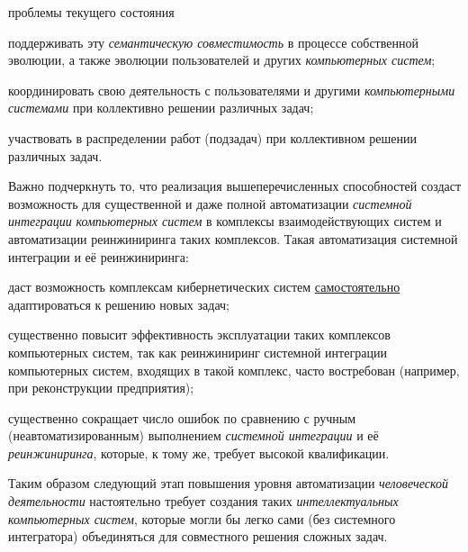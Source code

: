 \begin{scnsubstruct}
\begin{scnrelfromset}{проблемы текущего состояния}
{\begin{scnitemize}
                \item поддерживать эту \textit{семантическую совместимость} в процессе собственной эволюции, а также эволюции пользователей и других \textit{компьютерных систем};
                \item координировать свою деятельность с пользователями и другими \textit{компьютерными системами} при коллективно решении различных задач;
                \item участвовать в распределении работ (подзадач) при коллективном решении различных задач.
            \end{scnitemize}
            Важно подчеркнуть то, что реализация вышеперечисленных способностей создаст возможность для существенной и даже полной автоматизации \textit{системной интеграции} \textit{компьютерных систем} в комплексы взаимодействующих систем и автоматизации реинжиниринга таких комплексов. Такая автоматизация системной интеграции и её реинжиниринга:\\
            \begin{scnitemize}
                \item даст возможность комплексам кибернетических систем \uline{самостоятельно} адаптироваться к решению новых задач;
                \item существенно повысит эффективность эксплуатации таких комплексов компьютерных систем, так как реинжиниринг системной интеграции компьютерных систем, входящих в такой комплекс, часто востребован (например, при реконструкции предприятия);
                \item существенно сокращает число ошибок по сравнению с ручным (неавтоматизированным) выполнением \textit{системной интеграции} и её \textit{реинжиниринга}, которые, к тому же, требует высокой квалификации.
            \end{scnitemize}
            Таким образом следующий этап повышения уровня автоматизации \textit{человеческой деятельности} настоятельно требует создания таких \textit{интеллектуальных компьютерных систем}, которые могли бы легко сами (без системного интегратора) объединяться для совместного решения сложных задач. }
    \end{scnrelfromset}
    \bigskip
    

\end{scnsubstruct}
